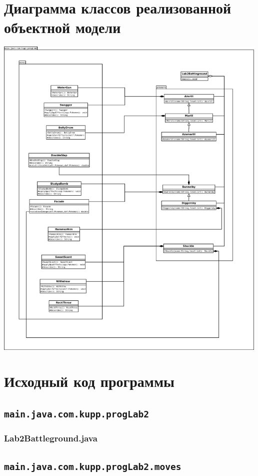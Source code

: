 \documentclass[11pt]{article}
\begin{document}
\section{Диаграмма классов реализованной объектной модели}
\includegraphics[width=500px]{../Diagram1.png}
\pagebreak
\section{Исходный код программы}
\small
\subsection{\texttt{main.java.com.kupp.progLab2}}
\subsubsection{Lab2Battleground.java}

\subsection{\texttt{main.java.com.kupp.progLab2.moves}}
\end{document}
